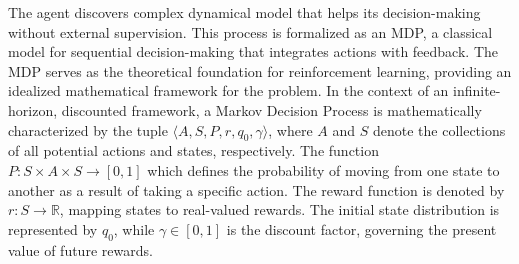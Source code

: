 \documentclass[conference]{IEEEtran}
\begin{document}
The agent discovers complex dynamical model that helps its decision-making without external supervision. This process is formalized as an MDP, a classical model for sequential decision-making that integrates actions with feedback. The MDP serves as the theoretical foundation for reinforcement learning, providing an idealized mathematical framework for the problem.
In the context of an infinite-horizon, discounted framework, a Markov Decision Process is mathematically characterized by the tuple \( \langle A, S, P, r, q_0, \gamma \rangle \), where \( A \) and \( S \) denote the collections of all potential actions and states, respectively. The function \( P: S \times A \times S \to [0, 1] \) 
which defines the probability of moving from one state to another as a result of taking a specific action. The reward function is denoted by \( r: S \to \mathbb{R} \), mapping states to real-valued rewards. 
The initial state distribution is represented by \( q_0 \), while \( \gamma \in [0, 1] \) is the discount factor, governing the present value of future rewards.



\end{document}
